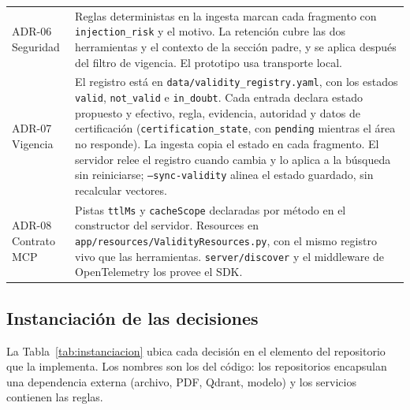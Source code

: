 \begin{longtable}{L{2.6cm} L{13.2cm}}
  ADR-06 Seguridad & Reglas deterministas en la ingesta marcan cada fragmento con \texttt{injection\_risk} y el motivo. La retención cubre las dos herramientas y el contexto de la sección padre, y se aplica después del filtro de vigencia. El prototipo usa transporte local.\\
  ADR-07 Vigencia & El registro está en \texttt{data/validity\_registry.yaml}, con los estados \texttt{valid}, \texttt{not\_valid} e \texttt{in\_doubt}. Cada entrada declara estado propuesto y efectivo, regla, evidencia, autoridad y datos de certificación (\texttt{certification\_state}, con \texttt{pending} mientras el área no responde). La ingesta copia el estado en cada fragmento. El servidor relee el registro cuando cambia y lo aplica a la búsqueda sin reiniciarse; \texttt{--sync-validity} alinea el estado guardado, sin recalcular vectores.\\
  ADR-08 Contrato MCP & Pistas \texttt{ttlMs} y \texttt{cacheScope} declaradas por método en el constructor del servidor. Resources en \texttt{app/resources/ValidityResources.py}, con el mismo registro vivo que las herramientas. \texttt{server/discover} y el middleware de OpenTelemetry los provee el SDK.\\
\end{longtable}

\subsection{Instanciación de las decisiones}

La Tabla~\ref{tab:instanciacion} ubica cada decisión en el elemento del repositorio que la implementa. Los nombres son los del código: los repositorios encapsulan una dependencia externa (archivo, PDF, Qdrant, modelo) y los servicios contienen las reglas.

